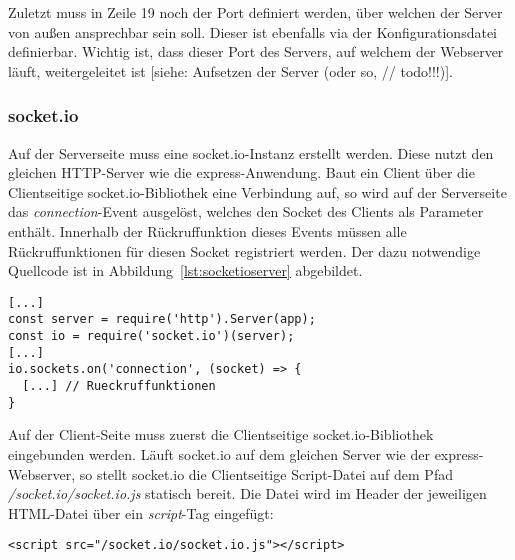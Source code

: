 Zuletzt muss in Zeile 19 noch der Port definiert werden, über welchen der Server von außen ansprechbar sein soll. Dieser ist ebenfalls via der Konfigurationsdatei definierbar. Wichtig ist, dass dieser Port des Servers, auf welchem der Webserver läuft, weitergeleitet ist [siehe: Aufsetzen der Server (oder so, // todo!!!)].

\subsubsection{socket.io}
Auf der Serverseite muss eine socket.io-Instanz erstellt werden. Diese nutzt den gleichen \acs{HTTP}-Server wie die express-Anwendung. Baut ein Client über die Clientseitige socket.io-Bibliothek eine Verbindung auf, so wird auf der Serverseite das \textit{connection}-Event ausgelöst, welches den Socket des Clients als Parameter enthält. Innerhalb der Rückruffunktion dieses Events müssen alle Rückruffunktionen für diesen Socket registriert werden. Der dazu notwendige Quellcode ist in Abbildung~\ref{lst:socketioserver} abgebildet.

\vspace{5pt}
\lstset{language=js, style=STYLE_CODE_JS}
\begin{minipage}{\textwidth}
\begin{singlespace}
\begin{lstlisting}[caption={Initialisierung des socket.io Servers -- Server.js}, captionpos=b, label={lst:socketioserver}]
[...]
const server = require('http').Server(app);
const io = require('socket.io')(server);
[...]
io.sockets.on('connection', (socket) => {
  [...] // Rueckruffunktionen
}
\end{lstlisting}
\end{singlespace}
\end{minipage}

Auf der Client-Seite muss zuerst die Clientseitige socket.io-Bibliothek eingebunden werden. Läuft socket.io auf dem gleichen Server wie der express-Webserver, so stellt socket.io die Clientseitige Script-Datei auf dem Pfad \textit{/socket.io/socket.io.js} statisch bereit. Die Datei wird im Header der jeweiligen \acs{HTML}-Datei über ein \textit{script}-Tag eingefügt:
\lstset{style=STYLE_COMMAND_LINE_ARGUMENT_SINGLE_LINE}
\begin{lstlisting}[belowskip=-0.8 \baselineskip]
<script src="/socket.io/socket.io.js"></script>
\end{lstlisting}
\par

